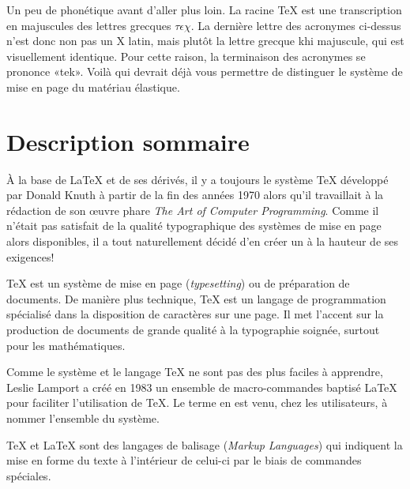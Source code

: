 Un peu de phonétique avant d'aller plus loin. La racine {\TeX} est une
transcription en majuscules des lettres grecques $\tau\epsilon\chi$.
La dernière lettre des acronymes ci-dessus n'est donc non pas un X
latin, mais plutôt la lettre grecque khi majuscule, qui est
visuellement identique. Pour cette raison, la terminaison des
acronymes se prononce «tek». Voilà qui devrait déjà vous permettre de
distinguer le système de mise en page du matériau élastique.



\section{Description sommaire}
\label{sec:presentation:description}

À la base de {\LaTeX} et de ses dérivés, il y a toujours le système
{\TeX} développé par Donald Knuth à partir de la fin des années 1970
alors qu'il travaillait à la rédaction de son {\oe}uvre phare
\emph{The Art of Computer Programming}. Comme il n'était pas satisfait
de la qualité typographique des systèmes de mise en page alors
disponibles, il a tout naturellement décidé d'en créer un à la hauteur
de ses exigences!

{\TeX} est un système de mise en page (\emph{typesetting}) ou de
préparation de documents. De manière plus technique, {\TeX} est un
langage de programmation spécialisé dans la disposition de caractères
sur une page. Il met l'accent sur la production de documents de grande
qualité à la typographie soignée, surtout pour les mathématiques.

Comme le système et le langage {\TeX} ne sont pas des plus faciles à
apprendre, Leslie Lamport a créé en 1983 un ensemble de
macro-commandes baptisé {\LaTeX} pour faciliter l'utilisation de
{\TeX}. Le terme en est venu, chez les utilisateurs, à nommer
l'ensemble du système.

{\TeX} et {\LaTeX} sont des langages de balisage (\emph{Markup
  Languages}) qui indiquent la mise en forme du texte à l'intérieur de
celui-ci par le biais de commandes spéciales.

